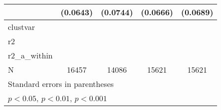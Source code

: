 {\begin{tabular}{l*{4}{c}}
            &    (0.0643)         &    (0.0744)         &    (0.0666)         &    (0.0689)         \\
\hline
clustvar    &                     &                     &                     &                     \\
r2          &                     &                     &                     &                     \\
r2\_a\_within &                     &                     &                     &                     \\
N           &       16457         &       14086         &       15621         &       15621         \\
\hline\hline
\multicolumn{5}{l}{\footnotesize Standard errors in parentheses}\\
\multicolumn{5}{l}{\footnotesize \sym{*} \(p<0.05\), \sym{**} \(p<0.01\), \sym{***} \(p<0.001\)}\\
\end{tabular}
}
